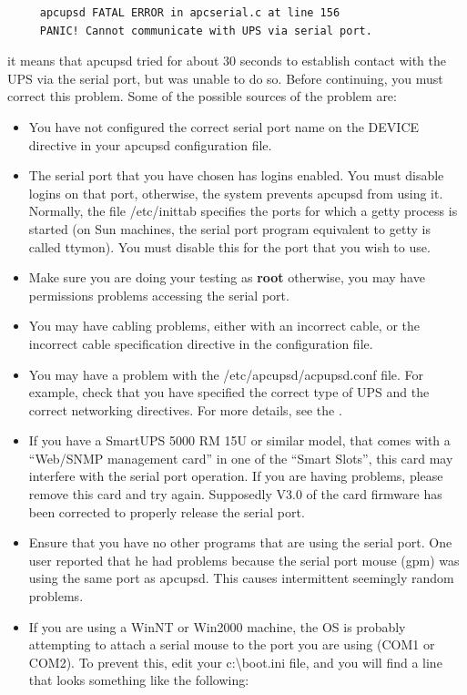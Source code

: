 {{{{{{{\footnotesize
\begin{verbatim}
     apcupsd FATAL ERROR in apcserial.c at line 156
     PANIC! Cannot communicate with UPS via serial port.
\end{verbatim}
\normalsize

it means that apcupsd tried for about 30 seconds to establish contact with the
UPS via the serial port, but was unable to do so. Before continuing, you must
correct this problem. Some of the possible sources of the problem are:  

\begin{itemize}
\item You have not configured the correct serial port name on the DEVICE
   directive in your apcupsd configuration file.  
\item The serial port that you have chosen has logins enabled. You must
   disable logins on that port, otherwise, the system prevents apcupsd from using
   it. Normally, the file /etc/inittab specifies the ports for which a getty
process is started (on Sun machines, the serial port program equivalent to
getty is called ttymon). You must disable this for the port that you wish to
use.  
\item Make sure you are doing your testing as {\bf root} otherwise, you may
   have permissions problems accessing the serial port.  
\item You may have cabling problems, either with an incorrect cable, or the
   incorrect cable specification directive in the configuration file.  
\item You may have a problem with the /etc/apcupsd/acpupsd.conf file. For
   example, check that you have specified the correct type of UPS and the correct
   networking directives.  For more details, see the 
.  
\item If you have a SmartUPS 5000 RM 15U or similar model, that comes with a
   ``Web/SNMP management card'' in one of the ``Smart Slots'', this card may
   interfere with the serial port operation. If you are having problems, please
remove this card and try again. Supposedly V3.0 of the card firmware has been
corrected to properly release the serial port.  
\item Ensure that you have no other programs that are using the serial port.
   One user reported that he had problems because the serial port mouse (gpm) was
   using the same port as apcupsd. This causes intermittent seemingly random
problems.  
\item If you are using a WinNT or Win2000 machine, the OS is probably
   attempting to attach a serial mouse to the port you are using (COM1 or COM2).
   To prevent this, edit your c:\textbackslash{}boot.ini file, and you will find
a line that looks something like the following:  


\end{itemize}}}}}}}}
